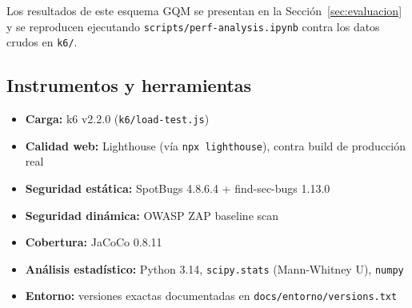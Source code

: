 Los resultados de este esquema GQM se presentan en la Sección~\ref{sec:evaluacion} y se reproducen
ejecutando \texttt{scripts/perf-analysis.ipynb} contra los datos crudos en \texttt{k6/}.

\subsection{Instrumentos y herramientas}

\begin{itemize}[nosep]
    \item \textbf{Carga:} k6 v2.2.0 (\texttt{k6/load-test.js})
    \item \textbf{Calidad web:} Lighthouse (vía \texttt{npx lighthouse}), contra build de producción real
    \item \textbf{Seguridad estática:} SpotBugs 4.8.6.4 + find-sec-bugs 1.13.0
    \item \textbf{Seguridad dinámica:} OWASP ZAP baseline scan
    \item \textbf{Cobertura:} JaCoCo 0.8.11
    \item \textbf{Análisis estadístico:} Python 3.14, \texttt{scipy.stats} (Mann-Whitney U), \texttt{numpy}
    \item \textbf{Entorno:} versiones exactas documentadas en \texttt{docs/entorno/versions.txt}
\end{itemize}
\newpage
